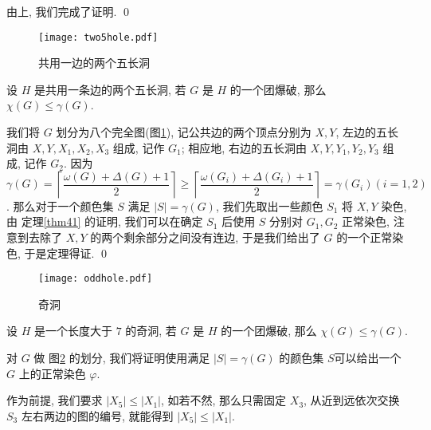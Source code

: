 \documentclass[12pt,a4paper]{article}%
\begin{document}
\begin{pf}
    由上, 我们完成了证明. \qed

\begin{figure}[h]
\begin{center}
\texttt{[image: two5hole.pdf]}
\caption{共用一边的两个五长洞}
\label{two5hole_pic}
\end{center}
\end{figure}

\begin{thm}\label{thm42}
    设 $H$ 是共用一条边的两个五长洞, 若 $G$ 是 $H$ 的一个团爆破, 那么 $\chi(G) \leq \gamma(G)$.
\end{thm}
\begin{pf}
    我们将 $G$ 划分为八个完全图(图\ref{two5hole_pic}), 记公共边的两个顶点分别为 $X,Y$, 左边的五长洞由 $X,Y,X_1,X_2,X_3$ 组成, 记作 $G_1$; 相应地, 右边的五长洞由 $X,Y,Y_1,Y_2,Y_3$ 组成, 记作 $G_2$. 因为 $\gamma(G) = \left\lceil \dfrac{\omega (G) + \Delta (G) + 1}{2}  \right\rceil \geq \left\lceil \dfrac{\omega (G_i) + \Delta (G_i) + 1}{2}  \right\rceil = \gamma(G_i) (i= 1,2) $. 那么对于一个颜色集 $S$ 满足 $|S| = \gamma(G)$, 我们先取出一些颜色 $S_1$ 将 $X,Y$ 染色, 由 定理\ref{thm41} 的证明, 我们可以在确定 $S_1$ 后使用 $S$ 分别对 $G_1,G_2$ 正常染色, 注意到去除了 $X,Y$ 的两个剩余部分之间没有连边, 于是我们给出了 $G$ 的一个正常染色, 于是定理得证. \qed
\end{pf}

\begin{figure}[h]
\begin{center}
\texttt{[image: oddhole.pdf]}
\caption{奇洞}
\label{oddhole_pic}
\end{center}
\end{figure}

\begin{thm}\label{thm43}
    设 $H$ 是一个长度大于 $7$ 的奇洞, 若 $G$ 是 $H$ 的一个团爆破, 那么 $\chi(G) \leq \gamma(G)$.
\end{thm}
\begin{pf}
    对 $G$ 做 图\ref{oddhole_pic} 的划分, 我们将证明使用满足 $|S| = \gamma(G)$ 的颜色集 $S$可以给出一个 $G$ 上的正常染色 $\varphi$.

    作为前提, 我们要求 $|X_5| \leq |X_1| $, 如若不然, 那么只需固定 $X_3$, 从近到远依次交换 $S_3$ 左右两边的图的编号, 就能得到 $|X_5| \leq |X_1| $. 
    

\end{pf}
\end{pf}
\end{document}
